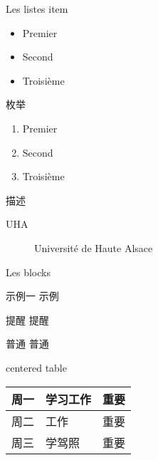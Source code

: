 \documentclass[10pt]{beamer}
\begin{document}
\begin{frame}{Les listes}
	item
	\begin{itemize}
		\item Premier
		\item Second
		\item Troisième
	\end{itemize}

	枚举
	\begin{enumerate}
		\item Premier
		\item Second
		\item Troisième
	\end{enumerate}

	描述
	\begin{description}
		\item [UHA] Université de Haute Alsace
	\end{description}
\end{frame}

\begin{frame}{Les blocks}
	\begin{exampleblock}{示例一}
		示例
	\end{exampleblock}
	\begin{alertblock}{提醒}
		提醒
	\end{alertblock}
	\begin{block}{普通}
		普通
	\end{block}
\end{frame}


\begin{frame}{centered table}

  \begin{center}
    \begin{tabular}{ |l|l|r| }
      \hline
      周一 &    学习工作  & 重要 \\
      \hline
      周二 &    工作     &  重要 \\
      \hline
      周三 &    学驾照   &  重要 \\    
      \hline
    \end{tabular}
  \end{center}

\end{frame}


\begin{frame}

  
\end{frame}
\end{document}
